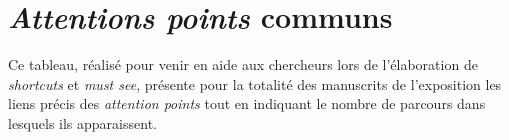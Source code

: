 	\chapter{\label{APcommuns}\textit{Attentions points} communs}
	Ce tableau, réalisé pour venir en aide aux chercheurs lors de l'élaboration de \textit{shortcuts} et \textit{must see}, présente pour la totalité des manuscrits de l'exposition les liens précis des \textit{attention points} tout en indiquant le nombre de parcours dans lesquels ils apparaissent.
	\begin{landscape}
		
	\end{landscape}
	

	
